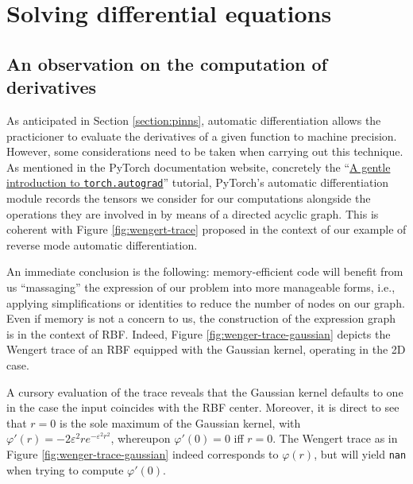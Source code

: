 \documentclass[12pt]{report} %
\begin{document}
\section{Solving differential equations}

\subsection{An observation on the computation of derivatives}

As anticipated in Section \ref{section:pinns}, automatic differentiation allows the
practicioner to evaluate the derivatives of a given function to machine precision.
However, some considerations need to be taken when carrying out this technique.
As mentioned in the PyTorch documentation website, concretely the 
``\href{https://pytorch.org/tutorials/beginner/blitz/autograd_tutorial.html}{A gentle
introduction to \texttt{torch.autograd}}'' tutorial, PyTorch's automatic differentiation
module records the tensors we consider for our computations alongside the operations 
they are involved in by means of a directed acyclic graph. This is coherent with
Figure \ref{fig:wengert-trace} proposed in the context of our example of reverse 
mode automatic differentiation.

An immediate conclusion is the following: memory-efficient code will benefit from us
``massaging'' the expression of our problem into more manageable forms, i.e., applying
simplifications or identities to reduce the number of nodes on our graph. 
Even if memory is not a concern to us, the construction of the expression graph is 
in the context of RBF. Indeed, Figure \ref{fig:wenger-trace-gaussian} 
depicts the Wengert trace of an RBF equipped with the Gaussian kernel, operating in the 2D
case.

A cursory evaluation of the trace reveals that the Gaussian kernel defaults to one in
the case the input coincides with the RBF center. Moreover, it is direct to see that  
$r=0$ is the sole maximum of the Gaussian kernel, with $\varphi'(r)=-2 \varepsilon^2 r
e^{-\varepsilon^2 r^2}$, whereupon $\varphi'(0)=0$ iff $r=0$. The Wengert trace as in Figure \ref{fig:wenger-trace-gaussian} 
indeed corresponds to $\varphi(r)$, but will yield \texttt{nan} when trying to compute 
$\varphi'(0)$.
\end{document}

